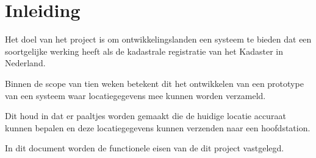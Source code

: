 \section{Inleiding}
Het doel van het project is om ontwikkelingslanden een systeem te bieden dat
een soortgelijke werking heeft als de kadastrale registratie van het Kadaster
in Nederland.

Binnen de scope van tien weken betekent dit het ontwikkelen van een prototype
van een systeem waar locatiegegevens mee kunnen worden verzameld.

Dit houd in dat er paaltjes worden gemaakt die de huidige locatie accuraat
kunnen bepalen en deze locatiegegevens kunnen verzenden naar een hoofdstation.

In dit document worden de functionele eisen van de dit project vastgelegd.

